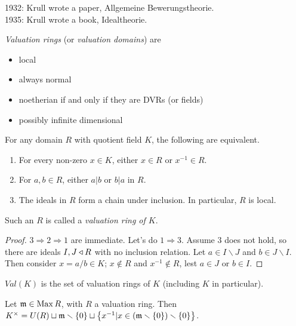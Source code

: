  1932: Krull wrote a paper, Allgemeine Bewerungstheorie.\\
 1935: Krull wrote a book, Idealtheorie.

 \emph{Valuation rings} (or \emph{valuation domains}) are
 \begin{itemize}
   \item local
   \item always normal
   \item noetherian if and only if they are DVRs (or fields)
   \item possibly infinite dimensional
 \end{itemize}
 \begin{proposition}
   For any domain $R$ with quotient field $K$, the following are equivalent.
   \begin{enumerate}
     \item For every non-zero $x\in K$, either $x\in R$ or $x^{-1}\in R$.
     \item For $a,b\in R$, either $a|b$ or $b|a$ in $R$.
     \item The ideals in $R$ form a chain under inclusion. In particular, $R$ is local.
   \end{enumerate}
 Such an $R$ is called a \emph{valuation ring of $K$}.
 \end{proposition}
 \begin{proof}
   $3\Rightarrow 2 \Rightarrow 1$ are immediate. Let's do $1\Rightarrow 3$. Assume $3$
   does not hold, so there are ideals $I,J\triangleleft R$ with no inclusion relation. Let $a\in
   I\smallsetminus J$ and $b\in J\smallsetminus I$. Then consider $x=a/b\in K$;
   $x\not\in R$ and $x^{-1}\not\in R$, lest $a\in J$ or $b\in I$.
 \end{proof}
 \begin{definition}
   $Val(K)$ is the set of valuation rings of $K$ (including $K$ in particular).
 \end{definition}
 Let $\mathfrak{m}\in \operatorname{Max} R$, with $R$ a valuation ring. Then $K^\times = U(R)\sqcup
 \mathfrak{m}\smallsetminus \{0\}\sqcup \bigl\{x^{-1}| x\in (\mathfrak{m}\smallsetminus \{0\})\smallsetminus
 \{0\}\bigr\}$.

